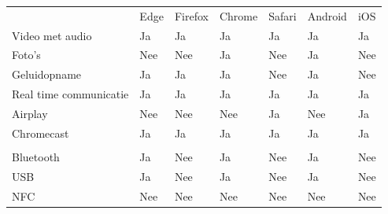 		\begin{table}[H]
			\centering
			\begin{tabular}{p{6cm}p{13mm}p{15mm}p{13mm}p{13mm}p{13mm}p{13mm}}
				& Edge & Firefox & Chrome & Safari& Android & iOS \\ 
				
				Video met audio & \cellcolor{green!40} Ja  & \cellcolor{green!40} Ja & \cellcolor{green!40} Ja  & \cellcolor{green!40} Ja & \cellcolor{green!40} Ja & \cellcolor{green!40} Ja \\
				
				Foto's & \cellcolor{red!50} Nee  & \cellcolor{red!50} Nee & \cellcolor{green!40} Ja  & \cellcolor{red!50} Nee  & \cellcolor{green!40} Ja & \cellcolor{red!50} Nee \\
				
				Geluidopname & \cellcolor{green!40} Ja  & \cellcolor{green!40} Ja & \cellcolor{green!40} Ja & \cellcolor{red!50} Nee  & \cellcolor{green!40} Ja & \cellcolor{red!50} Nee \\
				
				Real time communicatie& \cellcolor{green!40} Ja  & \cellcolor{green!40} Ja & \cellcolor{green!40} Ja  & \cellcolor{green!40} Ja & \cellcolor{green!40} Ja & \cellcolor{green!40} Ja \\
				
				Airplay & \cellcolor{red!50} Nee & \cellcolor{red!50} Nee & \cellcolor{red!50} Nee  & \cellcolor{green!40} Ja & \cellcolor{red!50} Nee & \cellcolor{green!40} Ja \\
				
				Chromecast & \cellcolor{green!40} Ja  & \cellcolor{green!40} Ja & \cellcolor{green!40} Ja  & \cellcolor{green!40} Ja & \cellcolor{green!40} Ja & \cellcolor{green!40} Ja \\
				
				 &  & &  &  &  &  \\
				 
				 Bluetooth & \cellcolor{green!40} Ja  &  \cellcolor{red!50} Nee & \cellcolor{green!40} Ja  & \cellcolor{red!50} Nee & \cellcolor{green!40} Ja &  \cellcolor{red!50} Nee \\
				 
				 USB & \cellcolor{green!40} Ja  &  \cellcolor{red!50} Nee & \cellcolor{green!40} Ja  & \cellcolor{red!50} Nee & \cellcolor{green!40} Ja &  \cellcolor{red!50} Nee \\
				 
				 NFC &  \cellcolor{red!50} Nee  &  \cellcolor{red!50} Nee &  \cellcolor{red!50} Nee  & \cellcolor{red!50} Nee &  \cellcolor{red!50} Nee &  \cellcolor{red!50} Nee \\
				 

\end{tabular}
\end{table}
